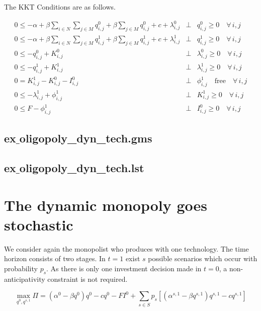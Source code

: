 \documentclass[11pt,a4paper]{article}
\begin{document}
The KKT Conditions are as follows.

\begin{eqnarray*}
	0 \leq -\alpha + \beta \sum_{i\in N}\sum_{j\in M}q_{i,j}^0 + \beta \sum_{j\in M}q_{i,j}^0+ c + \lambda_{i,j}^0 &\bot& q_{i,j}^0 \geq 0\quad\forall\, i,j\\
	0 \leq -\alpha + \beta \sum_{i\in N}\sum_{j\in M}q_{i,j}^1 + \beta\sum_{j\in M} q_{i,j}^1+ c + \lambda_{i,j}^1 &\bot& q_{i,j}^1 \geq 0\quad\forall\, i,j\\
	0 \leq -q_{i,j}^0 + K_{i,j}^0 &\bot& \lambda_{i,j}^0 \geq 0 \quad\forall\, i,j \\
        0 \leq -q_{i,j}^1 + K_{i,j}^1 &\bot& \lambda_{i,j}^1 \geq 0 \quad\forall\, i,j\\
        0 = K_{i,j}^1 - K_{i,j}^0 - I_{i,j}^0 &\bot& \phi_{i,j}^1 \quad \mbox{free} \quad\forall\, i,j \\
        0 \leq -\lambda_{i,j}^1 + \phi_{i,j}^1 &\bot& K_{i,j}^1 \geq 0 \quad\forall\, i,j\\
        0 \leq F - \phi_{i,j}^1 &\bot& I_{i,j}^0 \geq 0 \quad\forall\, i,j
\end{eqnarray*}

\subsection*{ex$\_$oligopoly\_dyn\_tech.gms}


\subsection*{ex$\_$oligopoly\_dyn\_tech.lst}


\section{The dynamic monopoly goes stochastic}


We consider again the monopolist who produces with one technology. The time horizon consists of two stages. In $t=1$ exist $s$ possible scenarios which occur with probability $p_s$. As there is only one investment decision made in $t=0$, a non-anticipativity constraint is not required. 

\begin{equation*}
	\max_{q^0,q^{s,1}}\Pi = (\alpha^0-\beta q^0)q^0 - cq^0 -FI^0 +  \sum_{s\in S}p_s\left[(\alpha^{s,1}-\beta q^{s,1})q^{s,1} - cq^{s,1}\right] 
\end{equation*}
\end{document}
